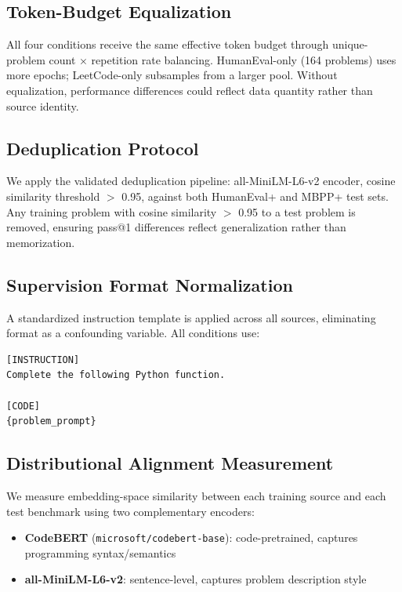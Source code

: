 \subsection{Token-Budget Equalization}

All four conditions receive the same effective token budget through unique-problem count $\times$
repetition rate balancing. HumanEval-only (164 problems) uses more epochs; LeetCode-only
subsamples from a larger pool. Without equalization, performance differences could reflect
data quantity rather than source identity.

\subsection{Deduplication Protocol}

We apply the validated deduplication pipeline: all-MiniLM-L6-v2 encoder, cosine similarity
threshold $>$ 0.95, against both HumanEval+ and MBPP+ test sets. Any training problem with
cosine similarity $>$ 0.95 to a test problem is removed, ensuring pass@1 differences reflect
generalization rather than memorization.

\subsection{Supervision Format Normalization}

A standardized instruction template is applied across all sources, eliminating format as
a confounding variable. All conditions use:

\begin{verbatim}
[INSTRUCTION]
Complete the following Python function.

[CODE]
{problem_prompt}
\end{verbatim}

\subsection{Distributional Alignment Measurement}

We measure embedding-space similarity between each training source and each test benchmark
using two complementary encoders:

\begin{itemize}
\item \textbf{CodeBERT} (\texttt{microsoft/codebert-base}): code-pretrained, captures programming syntax/semantics
\item \textbf{all-MiniLM-L6-v2}: sentence-level, captures problem description style
\end{itemize}

